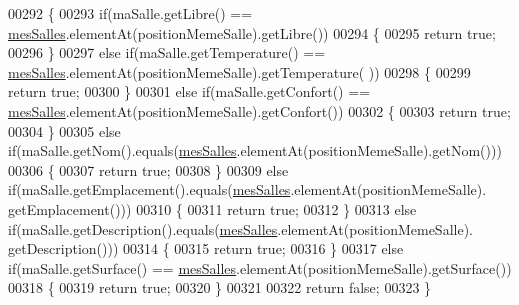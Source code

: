 \begin{DoxyCode}
00292     \{
00293         \textcolor{keywordflow}{if}(maSalle.getLibre() == \hyperlink{classcom_1_1lasalle_1_1meeting_1_1_main_activity_ab13e34516d877abc3ba937505b441979}{mesSalles}.elementAt(positionMemeSalle).getLibre())
00294         \{
00295             \textcolor{keywordflow}{return} \textcolor{keyword}{true};
00296         \}
00297         \textcolor{keywordflow}{else} \textcolor{keywordflow}{if}(maSalle.getTemperature() == \hyperlink{classcom_1_1lasalle_1_1meeting_1_1_main_activity_ab13e34516d877abc3ba937505b441979}{mesSalles}.elementAt(positionMemeSalle).getTemperature(
      ))
00298         \{
00299             \textcolor{keywordflow}{return} \textcolor{keyword}{true};
00300         \}
00301         \textcolor{keywordflow}{else} \textcolor{keywordflow}{if}(maSalle.getConfort() == \hyperlink{classcom_1_1lasalle_1_1meeting_1_1_main_activity_ab13e34516d877abc3ba937505b441979}{mesSalles}.elementAt(positionMemeSalle).getConfort())
00302         \{
00303             \textcolor{keywordflow}{return} \textcolor{keyword}{true};
00304         \}
00305         \textcolor{keywordflow}{else} \textcolor{keywordflow}{if}(maSalle.getNom().equals(\hyperlink{classcom_1_1lasalle_1_1meeting_1_1_main_activity_ab13e34516d877abc3ba937505b441979}{mesSalles}.elementAt(positionMemeSalle).getNom()))
00306         \{
00307             \textcolor{keywordflow}{return} \textcolor{keyword}{true};
00308         \}
00309         \textcolor{keywordflow}{else} \textcolor{keywordflow}{if}(maSalle.getEmplacement().equals(\hyperlink{classcom_1_1lasalle_1_1meeting_1_1_main_activity_ab13e34516d877abc3ba937505b441979}{mesSalles}.elementAt(positionMemeSalle).
      getEmplacement()))
00310         \{
00311             \textcolor{keywordflow}{return} \textcolor{keyword}{true};
00312         \}
00313         \textcolor{keywordflow}{else} \textcolor{keywordflow}{if}(maSalle.getDescription().equals(\hyperlink{classcom_1_1lasalle_1_1meeting_1_1_main_activity_ab13e34516d877abc3ba937505b441979}{mesSalles}.elementAt(positionMemeSalle).
      getDescription()))
00314         \{
00315             \textcolor{keywordflow}{return} \textcolor{keyword}{true};
00316         \}
00317         \textcolor{keywordflow}{else} \textcolor{keywordflow}{if}(maSalle.getSurface() == \hyperlink{classcom_1_1lasalle_1_1meeting_1_1_main_activity_ab13e34516d877abc3ba937505b441979}{mesSalles}.elementAt(positionMemeSalle).getSurface())
00318         \{
00319             \textcolor{keywordflow}{return} \textcolor{keyword}{true};
00320         \}
00321 
00322         \textcolor{keywordflow}{return} \textcolor{keyword}{false};
00323     \}
\end{DoxyCode}
\mbox{\label{classcom_1_1lasalle_1_1meeting_1_1_main_activity_ad0924169264a808e34a20c406efe0db2}} 

